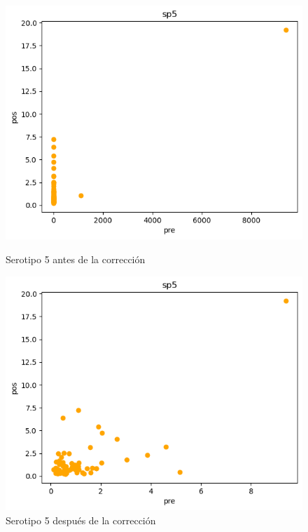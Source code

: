 \begin{figure}[H]
    \begin{minipage}{0.45\textwidth}
        \centering
        \includegraphics[width=\linewidth]{Graphics/sp5d.png}
        \caption{Serotipo 5 antes de la corrección}
        \label{fig:sp5d}
    \end{minipage}%
    \hfill
    \begin{minipage}{0.45\textwidth}
        \centering
        \includegraphics[width=\linewidth]{Graphics/sp5c.png}
        \caption{Serotipo 5 después de la corrección}
        \label{fig:sp5c}
    \end{minipage}
\end{figure}

